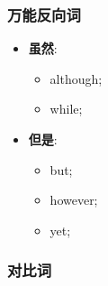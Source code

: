 \subsubsection{万能反向词}

  \begin{itemize}
    \item \textbf{虽然}:
    \begin{itemize}
      \item although;
      \item while;
    \end{itemize}

    \item \textbf{但是}:
    \begin{itemize}
      \item but;
      \item however;
      \item yet;
    \end{itemize}
  \end{itemize}

\subsubsection{对比词}

